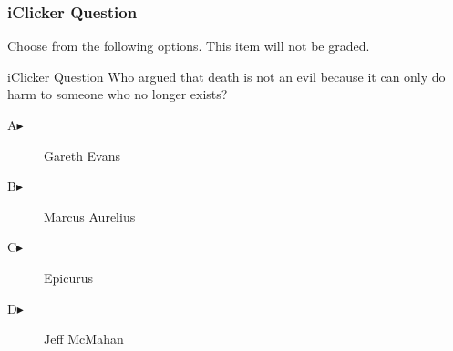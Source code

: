 \begin{frame}
  \frametitle{iClicker Question}
Choose from the following options. This item will not be graded.
\begin{block}{iClicker Question}
Who argued that death is not an evil because it can only do harm to
someone who no longer exists?
\end{block}
\begin{description}
\item[A\hspace{.2in}$\blacktriangleright$] Gareth Evans
\item[B\hspace{.2in}$\blacktriangleright$] Marcus Aurelius
\item[C\hspace{.2in}$\blacktriangleright$] Epicurus
\item[D\hspace{.2in}$\blacktriangleright$] Jeff McMahan
\end{description}
\end{frame}
